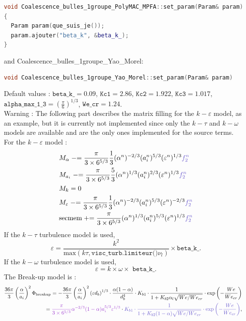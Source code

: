 \begin{lstlisting}[language=c++]
void Coalescence_bulles_1groupe_PolyMAC_MPFA::set_param(Param& param)
{
  Param param(que_suis_je());
  param.ajouter("beta_k", &beta_k_);
}
\end{lstlisting}
and {\color{myslateblue} Coalescence_bulles_1groupe_Yao_Morel}:
\begin{lstlisting}[language=c++]
void Coalescence_bulles_1groupe_Yao_Morel::set_param(Param& param)
\end{lstlisting}
Default values : $\texttt{beta\_k\_} = 0.09$, $\texttt{Kc1} = 2.86$, $\texttt{Kc2} = 1.922$, $\texttt{Kc3} = 1.017$,
$\texttt{alpha\_max\_1\_3} = (\frac{\pi}{6})^{1/3}$, $\texttt{We\_cr} = 1.24$.\\
{\color{red} Warning} : The following part describes the matrix filling for the $k-\varepsilon$ model, as an example, but it is currently not implemented since only the $k-\tau$ and $k-\omega$ models are available and are the only ones implemented for the source terms.\\
For the $k-\varepsilon$ model :
\begin{align}
    &M_{\alpha} \minuseq \frac{\pi}{3\times 6^{5/3}}\frac{1}{3}(\alpha^n)^{-2/3}(a_i^n)^{5/3}(\varepsilon^n)^{1/3} {\color{myslateblue} f_2^n}\\
    &M_{a_i} \minuseq \frac{\pi}{3\times 6^{5/3}}\frac{5}{3}(\alpha^n)^{1/3}(a_i^n)^{2/3}(\varepsilon^n)^{1/3} {\color{myslateblue} f_2^n}\\
    &M_{k}=0\\
    &M_{\varepsilon} \minuseq \frac{\pi}{3\times 6^{5/3}}\frac{1}{3}(\alpha^n)^{-2/3}(a_i^n)^{5/3}(\varepsilon^n)^{-2/3} {\color{myslateblue} f_2^n}\\
    &\text{secmem} \pluseq \frac{\pi}{3\times 6^{5/3}}(\alpha^n)^{1/3}(a_i^n)^{5/3}(\varepsilon^n)^{1/3} {\color{myslateblue} f_2^n}
\end{align}
If the $k-\tau$ turbulence model is used,
\begin{equation}
\varepsilon = \frac{k^2}{\text{max}(k\tau, \texttt{visc\_turb.limiteur()} \nu_l)}\times \texttt{beta\_k\_}.
\end{equation}
If the $k-\omega$ turbulence model is used,
\begin{equation}
\varepsilon = k \times \omega \times\texttt{ beta\_k\_}.
\end{equation}
The {\colorbox{codebackground}{\color{codekeyword3}  Break-up}} model is :
\begin{equation}
\begin{aligned}
		\frac{36\pi}{3}\parent{\frac{\alpha}{a_i}}^2\Phi_{\text{breakup}} =- \frac{36\pi}{3}\parent{\frac{\alpha}{a_i}}^2 \parent{\varepsilon d_b}^{1/3} \cdot \frac{\alpha(1-\alpha)}{d_b^4} \cdot K_{b1} \cdot \frac{1}{1 + K_{b2}\alpha_l \sqrt{We/We_{cr}}} \cdot \text{exp}\left(- \frac{We}{We_{cr}}\right)& & \\ = {\color{mydarkorchid} \frac{\pi}{3\times 6^{5/3}}\alpha^{-2/3}(1-\alpha)a_i^{5/3}\varepsilon^{1/3}} \cdot {\color{myslateblue} K_{b1} \cdot \frac{1}{1 + K_{b2}(1-\alpha) \sqrt{We/We_{cr}}} \cdot \text{exp}\left(- \frac{We}{We_{cr}}\right)},
\end{aligned}
\end{equation}
